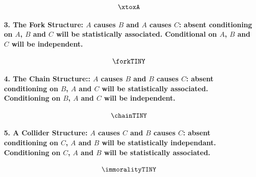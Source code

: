 \documentclass[
  singlecolumn]{article}
\let\oldparagraph\paragraph
\renewcommand{\paragraph}[1]{\oldparagraph{#1}\mbox{}}
\begin{document}
\[\xtoxA\]

\paragraph{\texorpdfstring{3. \textbf{The Fork Structure:} \(A\) causes
\(B\) and \(A\) causes \(C\): absent conditioning on \(A\), \(B\) and
\(C\) will be statistically associated. Conditional on \(A\), \(B\) and
\(C\) will be
independent.}{3. The Fork Structure: A causes B and A causes C: absent conditioning on A, B and C will be statistically associated. Conditional on A, B and C will be independent.}}\label{the-fork-structure-a-causes-b-and-a-causes-c-absent-conditioning-on-a-b-and-c-will-be-statistically-associated.-conditional-on-a-b-and-c-will-be-independent.}

\[\forkTINY\]

\paragraph{\texorpdfstring{4. \textbf{The Chain Structure:}: \(A\)
causes \(B\) and \(B\) causes \(C\): absent conditioning on \(B\), \(A\)
and \(C\) will be statistically associated. Conditioning on \(B\), \(A\)
and \(C\) will be
independent.}{4. The Chain Structure:: A causes B and B causes C: absent conditioning on B, A and C will be statistically associated. Conditioning on B, A and C will be independent.}}\label{the-chain-structure-a-causes-b-and-b-causes-c-absent-conditioning-on-b-a-and-c-will-be-statistically-associated.-conditioning-on-b-a-and-c-will-be-independent.}

\[\chainTINY\]

\paragraph{\texorpdfstring{5. \textbf{A Collider Structure:} \(A\)
causes \(C\) and \(B\) causes \(C\): absent conditioning on \(C\), \(A\)
and \(B\) will be statistically independant. Conditioning on \(C\),
\(A\) and \(B\) will be statistically
associated.}{5. A Collider Structure: A causes C and B causes C: absent conditioning on C, A and B will be statistically independant. Conditioning on C, A and B will be statistically associated.}}\label{a-collider-structure-a-causes-c-and-b-causes-c-absent-conditioning-on-c-a-and-b-will-be-statistically-independant.-conditioning-on-c-a-and-b-will-be-statistically-associated.}

\[\immoralityTINY\]
\end{document}
